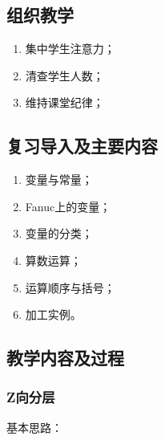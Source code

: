 \jxhj{%
	}

\makeshouye %

\subsection{组织教学}
\begin{enumerate}[\hspace{2em}1、]
	\item 集中学生注意力；
	\item 清查学生人数；
	\item 维持课堂纪律；
\end{enumerate}

\subsection{复习导入及主要内容}
\begin{enumerate}[1、]
\item 变量与常量；
\item Fanuc上的变量；
\item 变量的分类；
\item 算数运算；
\item 运算顺序与括号；
\item 加工实例。
\end{enumerate}

\subsection{教学内容及过程}
	
\subsubsection{Z向分层}
	基本思路：
	
